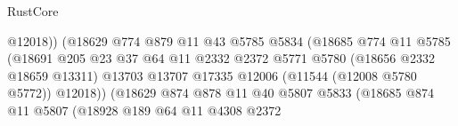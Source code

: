 \begin{lexlean}{RustCore}
\begin{coremodule}
                                                  @12018))
                                              (@18629
                                                @774
                                                @879
                                                @11
                                                @43
                                                @5785
                                                @5834
                                                (@18685
                                                  @774
                                                  @11
                                                  @5785
                                                  (@18691
                                                    @205
                                                    @23
                                                    @37
                                                    @64
                                                    @11
                                                    @2332
                                                    @2372
                                                    @5771
                                                    @5780
                                                    (@18656 @2332 @18659 @13311)
                                                    @13703
                                                    @13707
                                                    @17335
                                                    @12006
                                                    (@11544 (@12008 @5780 @5772))
                                                    @12018))
                                                (@18629
                                                  @874
                                                  @878
                                                  @11
                                                  @40
                                                  @5807
                                                  @5833
                                                  (@18685
                                                    @874
                                                    @11
                                                    @5807
                                                    (@18928
                                                      @189
                                                      @64
                                                      @11
                                                      @4308
                                                      @2372

\end{coremodule}
\end{lexlean}
